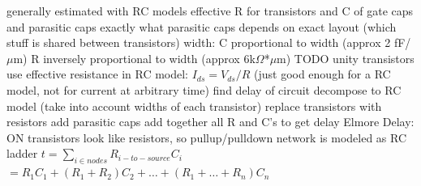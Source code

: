 \documentclass[12pt]{article}
\begin{document}
\begin{spacing}{0.8}
\begin{multicols*}{2}
\begin{flushleft}
\begin{outline}[longenum]
  \1 generally estimated with RC models
  \1 effective R for transistors and C of gate caps and parasitic caps
  \2 exactly what parasitic caps depends on exact layout (which stuff is shared between transistors)
  \1 width:
    \2 C proportional to width
     (approx 2 fF/$\mu$m)
    \2 R inversely proportional to width
      (approx 6k$\Omega$*$\mu$m)
    \2 TODO unity transistors
  \1 use effective resistance in RC model: $I_{ds}=V_{ds}/R$
    (just good enough for a RC model, not for current at arbitrary time)
  \1 find delay of circuit
    \2 decompose to RC model (take into account widths of each transistor)
      \3 replace transistors with resistors
      \3 add parasitic caps
    \2 add together all R and C's to get delay
  \1 Elmore Delay:
    \2 ON transistors look like resistors, so pullup/pulldown network is modeled as RC ladder
    \2 $t = \sum_{i\in nodes} R_{i-to-source}C_i$
    $= R_1C_1 + (R_1+R_2)C_2+\ldots+(R_1+\ldots+R_n)C_n$
    





\end{outline}
\end{flushleft}
\end{multicols*}
\end{spacing}
\end{document}
